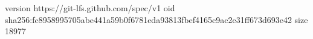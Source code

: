 version https://git-lfs.github.com/spec/v1
oid sha256:fc8958995705abe441a59b0f6781eda93813fbef4165c9ac2e31ff673d693e42
size 18977
